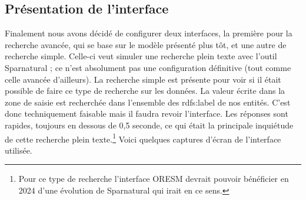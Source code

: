 \subsection{Présentation de l'interface}
Finalement nous avons décidé de configurer deux interfaces, la première pour la recherche avancée, qui se base sur le modèle présenté plus tôt, et une autre de recherche simple. Celle-ci veut simuler une recherche plein texte avec l'outil Sparnatural ; ce n'est absolument pas une configuration définitive (tout comme celle avancée d'ailleurs). La recherche simple est présente pour voir si il était possible de faire ce type de recherche sur les données. La valeur écrite dans la zone de saisie est recherchée dans l'ensemble des rdfs:label de nos entités. C'est donc techniquement faisable mais il faudra revoir l'interface. Les réponses sont rapides, toujours en dessous de 0,5 seconde, ce qui était la principale inquiétude de cette recherche plein texte.\footnote{Pour ce type de recherche l'interface ORESM devrait pouvoir bénéficier en 2024 d'une évolution de Sparnatural qui irait en ce sens.} Voici quelques captures d'écran de l'interface utilisée.

